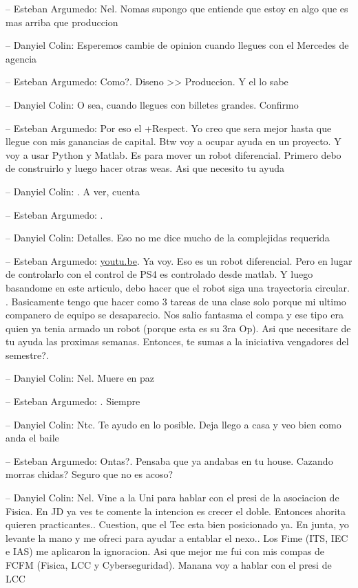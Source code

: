 -- Esteban Argumedo: Nel. Nomas supongo que entiende que estoy en algo
que es mas arriba que produccion

-- Danyiel Colin: Esperemos cambie de opinion cuando llegues con el
Mercedes de agencia

-- Esteban Argumedo: Como?. Diseno \textgreater\textgreater{}
Produccion. Y el lo sabe

-- Danyiel Colin: O sea, cuando llegues con billetes grandes. Confirmo

-- Esteban Argumedo: Por eso el +Respect. Yo creo que sera mejor hasta
que llegue con mis ganancias de capital. Btw voy a ocupar ayuda en un
proyecto. Y voy a usar Python y Matlab. Es para mover un robot
diferencial. Primero debo de construirlo y luego hacer otras weas. Asi
que necesito tu ayuda

-- Danyiel Colin: . A ver, cuenta

-- Esteban Argumedo: .

-- Danyiel Colin: Detalles. Eso no me dice mucho de la complejidas
requerida

-- Esteban Argumedo: \href{https://youtu.be/60l3N4I0JmI}{youtu.be}. Ya
voy. Eso es un robot diferencial. Pero en lugar de controlarlo con el
control de PS4 es controlado desde matlab. Y luego basandome en este
articulo, debo hacer que el robot siga una trayectoria circular. .
Basicamente tengo que hacer como 3 tareas de una clase solo porque mi
ultimo companero de equipo se desaparecio. Nos salio fantasma el compa y
ese tipo era quien ya tenia armado un robot (porque esta es su 3ra Op).
Asi que necesitare de tu ayuda las proximas semanas. Entonces, te sumas
a la iniciativa vengadores del semestre?.

-- Danyiel Colin: Nel. Muere en paz

-- Esteban Argumedo: . Siempre

-- Danyiel Colin: Ntc. Te ayudo en lo posible. Deja llego a casa y veo
bien como anda el baile

-- Esteban Argumedo: Ontas?. Pensaba que ya andabas en tu house. Cazando
morras chidas? Seguro que no es acoso?

-- Danyiel Colin: Nel. Vine a la Uni para hablar con el presi de la
asociacion de Fisica. En JD ya ves te comente la intencion es crecer el
doble. Entonces ahorita quieren practicantes.. Cuestion, que el Tec esta
bien posicionado ya. En junta, yo levante la mano y me ofreci para
ayudar a entablar el nexo.. Los Fime (ITS, IEC e IAS) me aplicaron la
ignoracion. Asi que mejor me fui con mis compas de FCFM (Fisica, LCC y
Cyberseguridad). Manana voy a hablar con el presi de LCC

